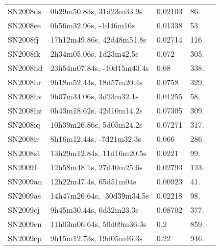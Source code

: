 \begin{longtable}{lllll}
         SN2008ds &       0h29m50.83s, 31d23m33.9s &  0.02103 &            86. &    \citet{1999PASP..111..438F} \\
         SN2008ee &         0h56m32.96s, -1d46m16s &  0.01338 &            53. &    \citet{1993AJ....106.1273Z} \\
         SN2008fj &      17h12m49.86s, 42d48m51.8s &  0.02714 &           116. &    \citet{1996AJ....112.1803M} \\
         SN2008fk &        2h34m05.06s, 1d23m42.5s &    0.072 &           305. &    \citet{2008CBET.1499A...1C} \\
         SN2008hd &     23h54m07.84s, -10d15m43.4s &     0.08 &           338. &    \citet{2008CBET.1570A...1S} \\
         SN2008hr &       9h18m52.44s, 18d57m20.4s &   0.0758 &           329. &    \citet{2007SDSS6.C...0000:} \\
         SN2008hv &        9h07m34.06s, 3d23m32.1s &  0.01255 &            58. &    \citet{2003AJ....126.2268W} \\
         SN2008hz &       0h43m18.62s, 42d10m14.2s &  0.07305 &           309. &  \citet{2006AandA...456..985G} \\
         SN2008iq &       10h39m26.86s, 5d05m24.2s &  0.07271 &           317. &    \citet{2004SDSS2.C...0000:} \\
         SN2008ir &       8h16m12.44s, -7d21m32.3s &    0.066 &           286. &    \citet{2009CBET.1662A...1S} \\
         SN2008s1 &      13h29m12.84s, 11d16m20.5s &   0.0221 &            99. &    \citet{2005SDSS4.C...0000:} \\
          SN2009L &       12h58m48.1s, 27d40m25.6s &  0.02793 &           123. &    \citet{2004AJ....128.1558S} \\
         SN2009an &         12h22m47.4s, 65d51m04s &  0.00923 &            41. &    \citet{2004SDSS2.C...0000:} \\
         SN2009as &     14h47m26.64s, -30d39m34.5s &  0.02218 &            98. &  \citet{2007AandA...465...71T} \\
         SN2009cj &        9h45m30.44s, 6d32m23.3s &  0.08702 &           377. &    \citet{2004SDSS3.C...0000:} \\
         SN2009cn &      11h03m06.64s, 50d09m36.3s &      0.2 &           859. &    \citet{2009CBET.1754A...1Q} \\
         SN2009cp &       9h15m12.73s, 19d05m46.3s &     0.22 &           946. &    \citet{2009CBET.1754A...1Q} \\

\end{longtable}
